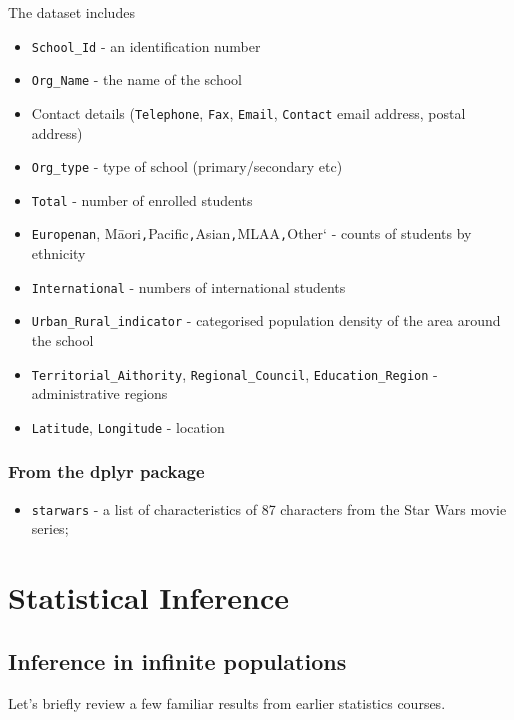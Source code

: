 \documentclass[
]{book}
\providecommand{\tightlist}{%
  \setlength{\itemsep}{0pt}\setlength{\parskip}{0pt}}
\begin{document}
The dataset includes

\begin{itemize}
\tightlist
\item
  \texttt{School\_Id} - an identification number
\item
  \texttt{Org\_Name} - the name of the school
\item
  Contact details (\texttt{Telephone}, \texttt{Fax}, \texttt{Email}, \texttt{Contact} email address, postal address)
\item
  \texttt{Org\_type} - type of school (primary/secondary etc)
\item
  \texttt{Total} - number of enrolled students
\item
  \texttt{Europenan}, Māori\texttt{,}Pacific\texttt{,}Asian\texttt{,}MLAA\texttt{,}Other` - counts of students by ethnicity
\item
  \texttt{International} - numbers of international students
\item
  \texttt{Urban\_Rural\_indicator} - categorised population density of the area around the school
\item
  \texttt{Territorial\_Aithority}, \texttt{Regional\_Council}, \texttt{Education\_Region} - administrative regions
\item
  \texttt{Latitude}, \texttt{Longitude} - location
\end{itemize}

\subsection{From the dplyr package}\label{from-the-dplyr-package}

\begin{itemize}
\tightlist
\item
  \texttt{starwars} - a list of characteristics of 87 characters from the Star Wars
  movie series;
\end{itemize}

\chapter{Statistical Inference}\label{statistical-inference}

\section{Inference in infinite populations}\label{inference-in-infinite-populations}

Let's briefly review a few familiar results from earlier statistics courses.
\end{document}
